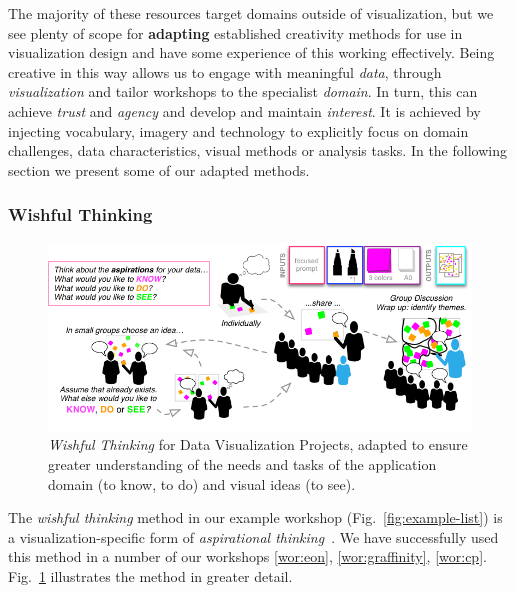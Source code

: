 
The majority of these resources target domains outside of visualization, but we see plenty of scope for \textbf{adapting} established creativity methods for use in visualization design and have some experience of this working effectively. Being creative in this way allows us to engage with meaningful \emph{data}, through \emph{visualization} and tailor workshops to the specialist \emph{domain}. In turn, this can achieve \emph{trust} and \emph{agency} and develop and maintain \emph{interest}. It is achieved by injecting vocabulary, imagery and technology to explicitly focus on domain challenges, data characteristics, visual methods or analysis tasks. In the following section we present some of our adapted methods.

\subsubsection{Wishful Thinking}

\begin{figure}[t]
    \centering
    \includegraphics[width=\columnwidth]{figures/wishful-thinking-process}
    \caption{ \emph{Wishful Thinking} for Data Visualization Projects, adapted to ensure greater understanding of the needs and tasks of the application domain (to know, to do) and visual ideas (to see).}
     \label{fig:wishful-thinking-process}
\end{figure}

The \emph{wishful thinking} method in our example workshop (Fig.~\ref{fig:example-list}) is a visualization-specific form of \emph{aspirational thinking}~\cite{McFadzean1998b}. We have successfully used this method in a number of our workshops \ref{wor:eon}, \ref{wor:graffinity}, \ref{wor:cp}. Fig.~\ref{fig:wishful-thinking-process} illustrates the method in greater detail. 

